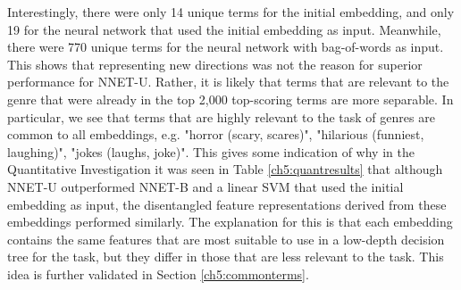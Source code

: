 Interestingly, there were only 14 unique terms for the initial embedding, and only 19 for the neural network that used the initial embedding as input. Meanwhile, there were 770 unique terms for the neural network with bag-of-words as input. This shows that representing new directions was not the reason for superior performance for NNET-U. Rather, it is likely that terms that are relevant to the genre that were already in the top 2,000 top-scoring terms are more separable. In particular, we see that terms that are highly relevant to the task of genres are common to all embeddings, e.g. "horror (scary, scares)", "hilarious (funniest, laughing)", "jokes (laughs, joke)". This gives some indication of why in the Quantitative Investigation it was seen in Table \ref{ch5:quantresults} that although NNET-U outperformed NNET-B and a linear SVM that used the initial embedding as input, the disentangled feature representations derived from these embeddings performed similarly. The explanation for this is that each embedding contains the same features that are most suitable to use in a low-depth decision tree for the task, but they differ in those that are less relevant to the task. This idea is further validated in Section \ref{ch5:commonterms}.


